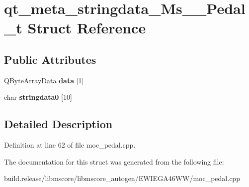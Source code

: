 \hypertarget{structqt__meta__stringdata___ms_____pedal__t}{}\section{qt\+\_\+meta\+\_\+stringdata\+\_\+\+Ms\+\_\+\+\_\+\+Pedal\+\_\+t Struct Reference}
\label{structqt__meta__stringdata___ms_____pedal__t}
\subsection*{Public Attributes}
\begin{DoxyCompactItemize}
\item 
\mbox{\label{structqt__meta__stringdata___ms_____pedal__t_ae4031e9664172cf872fda3ea84e0d4ff}} 
Q\+Byte\+Array\+Data {\bfseries data} \mbox{[}1\mbox{]}
\item 
\mbox{\label{structqt__meta__stringdata___ms_____pedal__t_a4fd1ced5ea66ab74dbc5202af1b891ab}} 
char {\bfseries stringdata0} \mbox{[}10\mbox{]}
\end{DoxyCompactItemize}


\subsection{Detailed Description}


Definition at line 62 of file moc\+\_\+pedal.\+cpp.



The documentation for this struct was generated from the following file\+:\begin{DoxyCompactItemize}
\item 
build.\+release/libmscore/libmscore\+\_\+autogen/\+E\+W\+I\+E\+G\+A46\+W\+W/moc\+\_\+pedal.\+cpp\end{DoxyCompactItemize}
